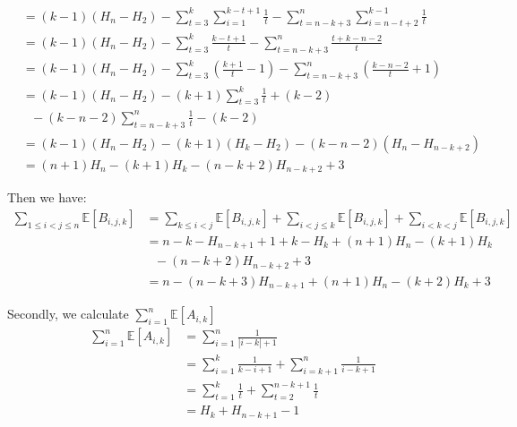 \begin{itemize}
\begin{align*}
        &= (k - 1)(H_n - H_2) - \sum_{t = 3}^{k} \sum_{i = 1}^{k - t + 1} \frac{1}{t} - \sum_{t = n - k + 3}^{n} \sum_{i = n - t + 2}^{k - 1} \frac{1}{t}\\
        &= (k - 1)(H_n - H_2) - \sum_{t = 3}^{k} \frac{k - t + 1}{t} - \sum_{t = n - k + 3}^{n} \frac{t + k - n - 2}{t}\\
        &= (k - 1)(H_n - H_2) - \sum_{t = 3}^{k} (\frac{k + 1}{t} - 1) - \sum_{t = n - k + 3}^{n} (\frac{k - n - 2}{t} + 1)\\
        &= (k - 1)(H_n - H_2) - (k + 1)\sum_{t = 3}^{k} \frac{1}{t} + (k - 2) \\
		&~~~-(k - n - 2) \sum_{t = n - k + 3}^{n} \frac{1}{t} - (k - 2)\\
        &= (k - 1)(H_n - H_2) - (k + 1)(H_k - H_2) - (k - n - 2)(H_n - H_{n - k + 2})\\
        &= (n + 1)H_n - (k + 1)H_k - (n - k + 2)H_{n - k + 2} + 3
        \end{align*}
        \end{itemize}
        Then we have:
        \begin{align*}
        \sum_{1 \leq i < j \leq n} \mathbb{E}[B_{i,j,k}]&=\sum_{k\leq i<j}\mathbb{E}[B_{i,j,k}] + \sum_{i<j\leq k}\mathbb{E}[B_{i,j,k}] + \sum_{i<k<j}\mathbb{E}[B_{i,j,k}]\\
			&=n-k-H_{n-k+1}+1+k-H_{k}+(n + 1)H_n - (k + 1)H_k\\
			&~~~- (n - k + 2)H_{n - k + 2} + 3\\
			&=n-(n-k+3)H_{n-k+1}+(n+1)H_n-(k+2)H_{k}+3
        \end{align*}
		
		Secondly, we calculate $\displaystyle \sum_{i = 1}^{n} \mathbb{E}[A_{i,k}]$
		 \begin{align*}
			\sum_{i = 1}^{n} \mathbb{E}[A_{i,k}] &= \sum_{i = 1}^{n} \frac{1}{|i - k| + 1}\\
										&= \sum_{i = 1}^{k} \frac{1}{k - i + 1} + \sum_{i = k + 1}^{n} \frac{1}{i - k + 1}\\
										&= \sum_{t = 1}^{k} \frac{1}{t} + \sum_{t = 2}^{n - k + 1} \frac{1}{t}\\
										&= H_k + H_{n - k + 1} - 1
		 \end{align*}
		 
